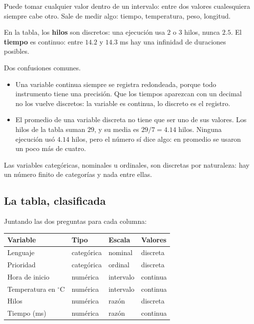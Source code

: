 \documentclass[11pt,letterpaper]{article}
\begin{document}
\begin{definicion}
    Puede tomar cualquier valor dentro de un intervalo: entre dos
    valores cualesquiera siempre cabe otro. Sale de medir algo: tiempo,
    temperatura, peso, longitud.
\end{definicion}

En la tabla, los \textbf{hilos} son discretos: una ejecución usa $2$ o
$3$ hilos, nunca $2.5$. El \textbf{tiempo} es continuo: entre $14.2$ y
$14.3$ ms hay una infinidad de duraciones posibles.

\begin{ojo}
    Dos confusiones comunes.
    \begin{itemize}[itemsep=0.2em]
        \item Una variable continua siempre se registra redondeada,
              porque todo instrumento tiene una precisión. Que los
              tiempos aparezcan con un decimal no los vuelve
              discretos: la variable es continua, lo discreto es el
              registro.
        \item El promedio de una variable discreta no tiene que ser uno
              de sus valores. Los hilos de la tabla suman $29$, y su
              media es $29 / 7 = 4.14$ hilos. Ninguna ejecución usó
              $4.14$ hilos, pero el número sí dice algo: en promedio se
              usaron un poco más de cuatro.
    \end{itemize}
\end{ojo}

Las variables categóricas, nominales u ordinales, son discretas por
naturaleza: hay un número finito de categorías y nada entre ellas.


\subsection*{La tabla, clasificada}

Juntando las dos preguntas para cada columna:

\begin{center}
\begin{tabular}{llll}
    \toprule
    \textbf{Variable} & \textbf{Tipo} & \textbf{Escala}
    & \textbf{Valores} \\
    \midrule
    Lenguaje             & categórica & nominal   & discreta \\
    Prioridad            & categórica & ordinal   & discreta \\
    Hora de inicio       & numérica   & intervalo & continua \\
    Temperatura en $^\circ$C & numérica & intervalo & continua \\
    Hilos                & numérica   & razón     & discreta \\
    Tiempo (ms)          & numérica   & razón     & continua \\
    \bottomrule
\end{tabular}
\end{center}
\end{document}
